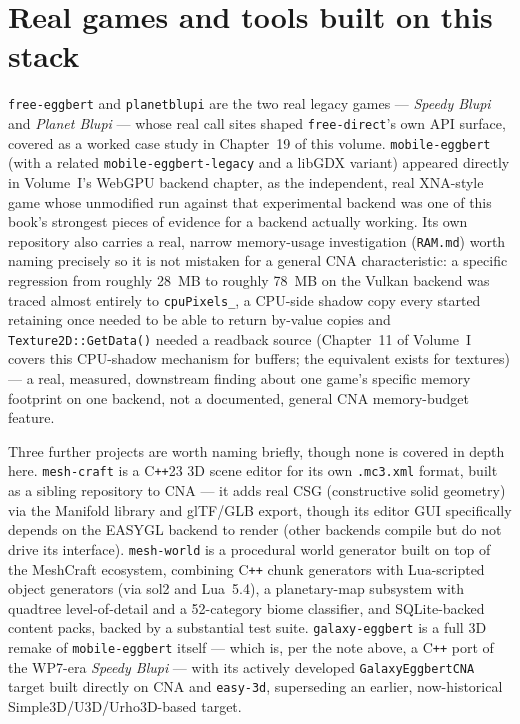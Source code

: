 \section{Real games and tools built on this stack}

\texttt{free-eggbert} and \texttt{planetblupi} are the two real legacy games --- \emph{Speedy
Blupi} and \emph{Planet Blupi} --- whose real call sites shaped \texttt{free-direct}'s own API
surface, covered as a worked case study in Chapter~19 of this volume.
\texttt{mobile-eggbert} (with a related \texttt{mobile-eggbert-legacy} and a libGDX variant)
appeared directly in Volume~I's WebGPU backend chapter, as the independent, real XNA-style
game whose unmodified run against that experimental backend was one of this book's strongest
pieces of evidence for a backend actually working. Its own repository also carries a real,
narrow memory-usage investigation (\texttt{RAM.md}) worth naming precisely so it is not
mistaken for a general CNA characteristic: a specific regression from roughly 28~MB to
roughly 78~MB on the Vulkan backend was traced almost entirely to \texttt{cpuPixels\_}, a
CPU-side shadow copy every  started retaining once
 needed to be able to return by-value copies and
\texttt{Texture2D::GetData()} needed a readback source (Chapter~11 of Volume~I covers this
CPU-shadow mechanism for buffers; the equivalent exists for textures) --- a real, measured,
downstream finding about one game's specific memory footprint on one backend, not a
documented, general CNA memory-budget feature.

Three further projects are worth naming briefly, though none is covered in depth here.
\texttt{mesh-craft} is a C\texttt{++}23 3D scene editor for its own \texttt{.mc3.xml} format,
built as a sibling repository to CNA --- it adds real CSG (constructive solid geometry) via the
Manifold library and glTF/GLB export, though its editor GUI specifically depends on the EASYGL
backend to render (other backends compile but do not drive its interface). \texttt{mesh-world}
is a procedural world generator built on top of the MeshCraft ecosystem, combining C\texttt{++}
chunk generators with Lua-scripted object generators (via sol2 and Lua~5.4), a planetary-map
subsystem with quadtree level-of-detail and a 52-category biome classifier, and SQLite-backed
content packs, backed by a substantial test suite. \texttt{galaxy-eggbert} is a full 3D remake
of \texttt{mobile-eggbert} itself --- which is, per the note above, a C\texttt{++} port of the
WP7-era \emph{Speedy Blupi} --- with its actively developed \texttt{GalaxyEggbertCNA} target
built directly on CNA and \texttt{easy-3d}, superseding an earlier, now-historical
Simple3D/U3D/Urho3D-based target.

